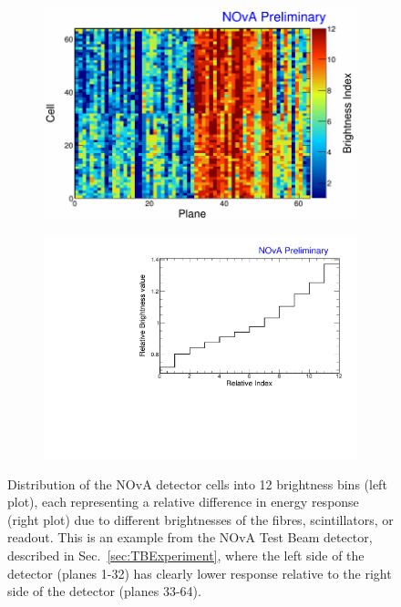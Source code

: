 
\begin{figure}[hbtp]
\centering
\begin{subfigure}[b]{0.495\textwidth}
\centering
\includegraphics[width=\textwidth]{Plots/NOvAExperiment/BrightnessIndex.png}
\end{subfigure}
\begin{subfigure}[b]{0.495\textwidth}
\centering
\includegraphics[width=\textwidth]{Plots/NOvAExperiment/BrightnessIndexToValue.pdf}
\end{subfigure}
\caption[Fibre Brightness bins for the NOvA calibration]{Distribution of the \acrshort{NOvA} detector cells into 12 brightness bins (left plot), each representing a relative difference in energy response (right plot) due to different brightnesses of the fibres, scintillators, or readout. This is an example from the \acrshort{NOvA} Test Beam detector, described in Sec.~\ref{sec:TBExperiment}, where the left side of the detector (planes 1-32) has clearly lower response relative to the right side of the detector (planes 33-64).}
\label{fig:NOvAFiberBrightness}
\end{figure}

